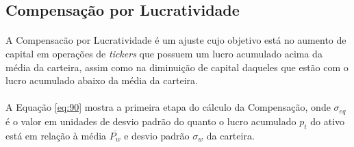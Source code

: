 



\FloatBarrier
\subsection{Compensação por Lucratividade}
\label{profit_comp}

\paragraph{} A Compensacão por Lucratividade é um ajuste cujo objetivo está no aumento de capital em operações de \textit{tickers} que possuem um lucro acumulado acima da média da carteira, assim como na diminuição de capital daqueles que estão com o lucro acumulado abaixo da média da carteira.

\paragraph{} A Equação \ref{eq:90} mostra a primeira etapa do cálculo da Compensação, onde \begin{math} \sigma_{eq} \end{math} é o valor em unidades de desvio padrão do quanto o lucro acumulado \begin{math} p_t \end{math} do ativo está em relação à média \begin{math} \overline{P_w} \end{math} e desvio padrão \begin{math} \sigma_w \end{math} da carteira.

